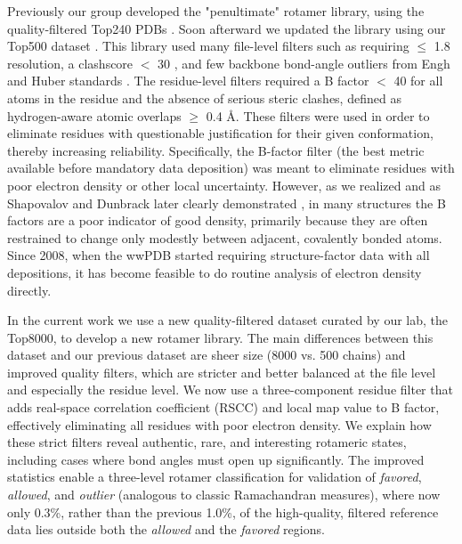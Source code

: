 Previously our group developed the "penultimate" rotamer library, using the quality-filtered Top240 PDBs \cite{lovell2000penultimate}. Soon afterward we updated the library using our Top500 dataset \cite{Lovell:2003uq}. This library used many file-level filters such as requiring $\le$ 1.8 resolution, a clashscore $<$ 30 \cite{Word1999}, and few backbone bond-angle outliers from Engh and Huber standards \cite{Engh1991}. The residue-level filters required a B factor $<$ 40 for all atoms in the residue and the absence of serious steric clashes, defined as hydrogen-aware atomic overlaps $\ge$ 0.4 \AA \cite{Word1999}. These filters were used in order to eliminate residues with questionable justification for their given conformation, thereby increasing reliability. Specifically, the B-factor filter (the best metric available before mandatory data deposition) was meant to eliminate residues with poor electron density or other local uncertainty. However, as we realized and as Shapovalov and Dunbrack later clearly demonstrated \cite{Shapovalov:2007}, in many structures the B factors are a poor indicator of good density, primarily because they are often restrained to change only modestly between adjacent, covalently bonded atoms. Since 2008, when the wwPDB started requiring structure-factor data with all depositions, it has become feasible to do routine analysis of electron density directly.

In the current work we use a new quality-filtered dataset curated by our lab, the Top8000, to develop a new rotamer library. The main differences between this dataset and our previous dataset are sheer size (8000 vs. 500 chains) and improved quality filters, which are stricter and better balanced at the file level and especially the residue level. We now use a three-component residue filter that adds real-space correlation coefficient (RSCC) and local map value to B factor, effectively eliminating all residues with poor electron density. We explain how these strict filters reveal authentic, rare, and interesting rotameric states, including cases where bond angles must open up significantly. The improved statistics enable a three-level rotamer classification for validation of \textit{favored}, \textit{allowed}, and \textit{outlier} (analogous to classic Ramachandran measures), where now only 0.3\%, rather than the previous 1.0\%, of the high-quality, filtered reference data lies outside both the \textit{allowed} and the \textit{favored} regions.
